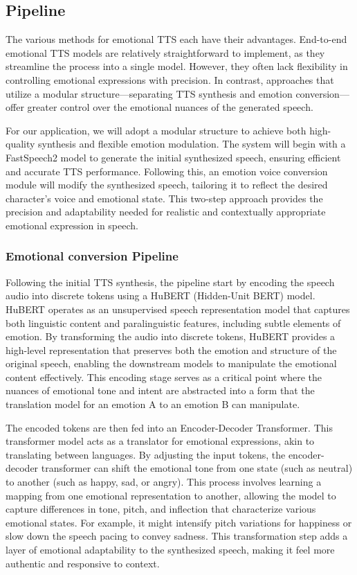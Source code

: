 \subsection{Pipeline}

The various methods for emotional TTS each have their advantages. End-to-end emotional TTS models are relatively straightforward to implement, as they streamline the process into a single model. However, they often lack flexibility in controlling emotional expressions with precision. In contrast, approaches that utilize a modular structure—separating TTS synthesis and emotion conversion—offer greater control over the emotional nuances of the generated speech.

For our application, we will adopt a modular structure to achieve both high-quality synthesis and flexible emotion modulation. The system will begin with a FastSpeech2 model to generate the initial synthesized speech, ensuring efficient and accurate TTS performance. Following this, an emotion voice conversion module will modify the synthesized speech, tailoring it to reflect the desired character’s voice and emotional state. This two-step approach provides the precision and adaptability needed for realistic and contextually appropriate emotional expression in speech.

\subsubsection{Emotional conversion Pipeline}

Following the initial TTS synthesis, the pipeline start by encoding the speech audio into discrete tokens using a HuBERT (Hidden-Unit BERT) model\cite{hsu2021hubert}. HuBERT operates as an unsupervised speech representation model that captures both linguistic content and paralinguistic features, including subtle elements of emotion. By transforming the audio into discrete tokens, HuBERT provides a high-level representation that preserves both the emotion and structure of the original speech, enabling the downstream models to manipulate the emotional content effectively. This encoding stage serves as a critical point where the nuances of emotional tone and intent are abstracted into a form that the translation model for an emotion A to an emotion B can manipulate.

The encoded tokens are then fed into an Encoder-Decoder Transformer. This transformer model acts as a translator for emotional expressions, akin to translating between languages. By adjusting the input tokens, the encoder-decoder transformer can shift the emotional tone from one state (such as neutral) to another (such as happy, sad, or angry). This process involves learning a mapping from one emotional representation to another, allowing the model to capture differences in tone, pitch, and inflection that characterize various emotional states. For example, it might intensify pitch variations for happiness or slow down the speech pacing to convey sadness. This transformation step adds a layer of emotional adaptability to the synthesized speech, making it feel more authentic and responsive to context.

